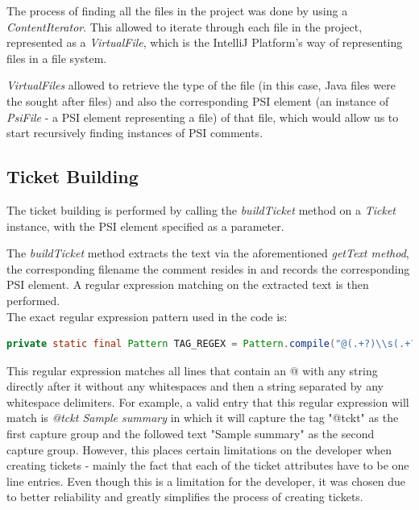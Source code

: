 \documentclass{4thYearProject}
\begin{document}
The process of finding all the files in the project was done by using a \textit{ContentIterator}. This allowed to iterate through each file in the project, represented as a \textit{VirtualFile}, which is the IntelliJ Platform's way of representing files in a file system. 

\textit{VirtualFiles} allowed to retrieve the type of the file (in this case, Java files were the sought after files) and also the corresponding PSI element (an instance of \textit{PsiFile} - a PSI element representing a file) of that file, which would allow us to start recursively finding instances of PSI comments.  

\subsection{Ticket Building}

The ticket building is performed by calling the \textit{buildTicket} method on a \textit{Ticket} instance, with the PSI element specified as a parameter. 

The \textit{buildTicket} method extracts the text via the aforementioned \textit{getText method}, the corresponding filename the comment resides in and records the corresponding PSI element. A regular expression matching on the extracted text is then performed. \\
\newline
The exact regular expression pattern used in the code is:
\begin{lstlisting}[language=Java, basicstyle=\footnotesize\tt,        % the size of the fonts that are used for the code
  frame=single,                    % adds a frame around the code
  language=Java,                 % the language of the code
  keywordstyle=\bf]
 private static final Pattern TAG_REGEX = Pattern.compile("@(.+?)\\s(.+?)\\n");
\end{lstlisting}

This regular expression matches all lines that contain an @ with any string directly after it without any whitespaces and then a string separated by any whitespace delimiters. For example, a valid entry that this regular expression will match is \textit{@tckt Sample summary} in which it will capture the tag "@tckt" as the first capture group and the followed text "Sample summary" as the second capture group. However, this places certain limitations on the developer when creating tickets - mainly the fact that each of the ticket attributes have to be one line entries. Even though this is a limitation for the developer, it was chosen due to better reliability and greatly simplifies the process of creating tickets.
\end{document}
